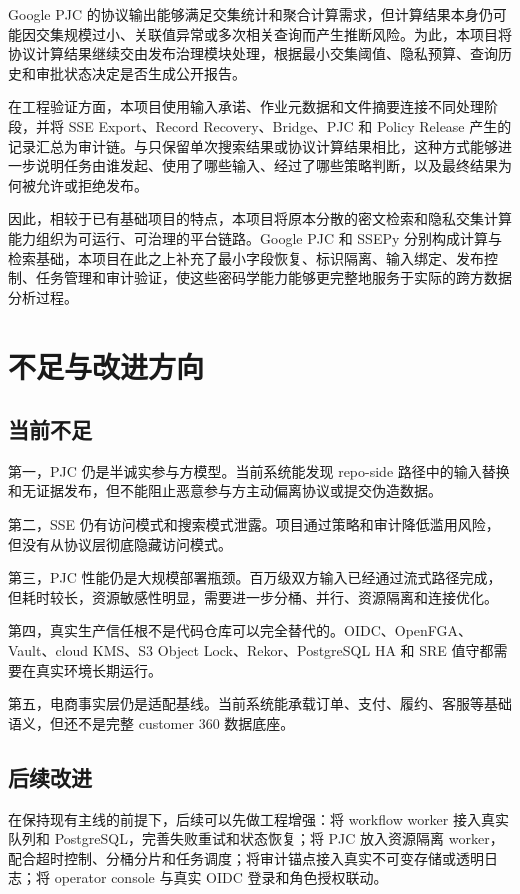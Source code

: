 \documentclass[UTF8,a4paper,12pt,oneside]{ctexrep}
\begin{document}
Google PJC 的协议输出能够满足交集统计和聚合计算需求，但计算结果本身仍可能因交集规模过小、关联值异常或多次相关查询而产生推断风险。为此，本项目将协议计算结果继续交由发布治理模块处理，根据最小交集阈值、隐私预算、查询历史和审批状态决定是否生成公开报告。

在工程验证方面，本项目使用输入承诺、作业元数据和文件摘要连接不同处理阶段，并将 SSE Export、Record Recovery、Bridge、PJC 和 Policy Release 产生的记录汇总为审计链。与只保留单次搜索结果或协议计算结果相比，这种方式能够进一步说明任务由谁发起、使用了哪些输入、经过了哪些策略判断，以及最终结果为何被允许或拒绝发布。

因此，相较于已有基础项目的特点，本项目将原本分散的密文检索和隐私交集计算能力组织为可运行、可治理的平台链路。Google PJC 和 SSEPy 分别构成计算与检索基础，本项目在此之上补充了最小字段恢复、标识隔离、输入绑定、发布控制、任务管理和审计验证，使这些密码学能力能够更完整地服务于实际的跨方数据分析过程。



\chapter{不足与改进方向}

\section{当前不足}

第一，PJC 仍是半诚实参与方模型。当前系统能发现 repo-side 路径中的输入替换和无证据发布，但不能阻止恶意参与方主动偏离协议或提交伪造数据。

第二，SSE 仍有访问模式和搜索模式泄露。项目通过策略和审计降低滥用风险，但没有从协议层彻底隐藏访问模式。

第三，PJC 性能仍是大规模部署瓶颈。百万级双方输入已经通过流式路径完成，但耗时较长，资源敏感性明显，需要进一步分桶、并行、资源隔离和连接优化。

第四，真实生产信任根不是代码仓库可以完全替代的。OIDC、OpenFGA、Vault、cloud KMS、S3 Object Lock、Rekor、PostgreSQL HA 和 SRE 值守都需要在真实环境长期运行。

第五，电商事实层仍是适配基线。当前系统能承载订单、支付、履约、客服等基础语义，但还不是完整 customer 360 数据底座。

\section{后续改进}

在保持现有主线的前提下，后续可以先做工程增强：将 workflow worker 接入真实队列和 PostgreSQL，完善失败重试和状态恢复；将 PJC 放入资源隔离 worker，配合超时控制、分桶分片和任务调度；将审计锚点接入真实不可变存储或透明日志；将 operator console 与真实 OIDC 登录和角色授权联动。
\end{document}
